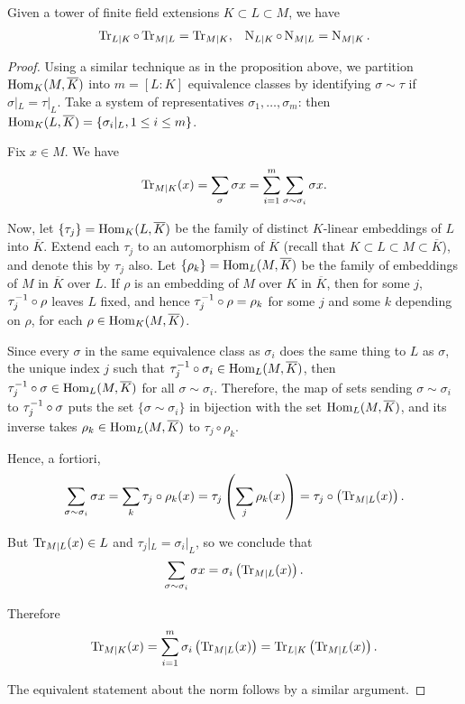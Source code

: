 \begin{cor}[Neukirch 2.7]
	Given a tower of finite field extensions $K\subset L\subset M$, we have
	\begin{align*}
		\operatorname{Tr}_{L\mid K} \circ \operatorname{Tr}_{M\mid L} = \operatorname{Tr}_{M\mid K}, & & \operatorname{N}_{L\mid K} \circ \operatorname{N}_{M\mid L} = \operatorname{N}_{M\mid K}.
	\end{align*}
\end{cor}
\begin{proof}
	Using a similar technique as in the proposition above, we partition $\text{Hom}_K(M,\overline{K})$ into $m=[L:K]$ equivalence classes by identifying $\sigma\sim\tau$ if $\sigma|_L = \tau|_L$. Take a system of representatives $\sigma_1,\dots,\sigma_m$: then $\text{Hom}_K(L,\overline{K}) = \{\sigma_i|_L , 1\leq i \leq m\}$.

	Fix $x\in M$. We have
	\begin{align*}
		\operatorname{Tr}_{M\mid K}(x) = \sum_\sigma \sigma x = \sum_{i=1}^m \sum_{\sigma\sim\sigma_i} \sigma x.
	\end{align*}

	Now, let $\{\tau_j\} = \text{Hom}_K(L,\overline{K})$ be the family of distinct $K$-linear embeddings of $L$ into $\overline{K}$. Extend each $\tau_j$ to an automorphism of $\overline{K}$ (recall that $K\subset L\subset M \subset \overline{K}$), and denote this by $\tau_j$ also. Let $\{\rho_k\}=\text{Hom}_L(M,\overline{K})$ be the family of embeddings of $M$ in $\overline{K}$ over $L$. If $\rho$ is an embedding of $M$ over $K$ in $\overline{K}$, then for some $j$, $\tau_j^{-1}\circ\rho$ leaves $L$ fixed, and hence $\tau_j^{-1}\circ\rho=\rho_k$ for some $j$ and some $k$ depending on $\rho$, for each $\rho\in\text{Hom}_K(M,\overline{K})$.

	Since every $\sigma$ in the same equivalence class as $\sigma_i$ does the same thing to $L$ as $\sigma$, the unique index $j$ such that $\tau_j^{-1}\circ\sigma_i\in\text{Hom}_L(M,\overline{K})$, then $\tau_j^{-1}\circ\sigma\in\text{Hom}_L(M,\overline{K})$ for all $\sigma\sim\sigma_i$. Therefore, the map of sets sending $\sigma\sim\sigma_i$ to $\tau_j^{-1}\circ\sigma$ puts the set $\{\sigma\sim\sigma_i\}$ in bijection with the set $\text{Hom}_L(M,\overline{K})$, and its inverse takes $\rho_k\in\text{Hom}_L(M,\overline{K})$ to $\tau_j\circ\rho_k$.

	Hence, a fortiori,
	\[
		\sum_{\sigma\sim\sigma_i} \sigma x = \sum_k \tau_j\circ\rho_k(x) = \tau_j\left(\sum_j\rho_k(x)\right) = \tau_j\circ\left(\operatorname{Tr}_{M\mid L}(x)\right).
	\]

	But $\operatorname{Tr}_{M\mid L}(x)\in L$ and $\tau_j|_L=\sigma_i|_L$, so we conclude that
	\[
		\sum_{\sigma\sim\sigma_i} \sigma x = \sigma_i\left(\operatorname{Tr}_{M\mid L}(x)\right).
	\]

	Therefore
	\[
		\operatorname{Tr}_{M\mid K}(x) = \sum_{i=1}^m \sigma_i\left(\operatorname{Tr}_{M\mid L}(x)\right) = \operatorname{Tr}_{L\mid K}\left(\operatorname{Tr}_{M\mid L}(x)\right).
	\]

	The equivalent statement about the norm follows by a similar argument.

\end{proof}


